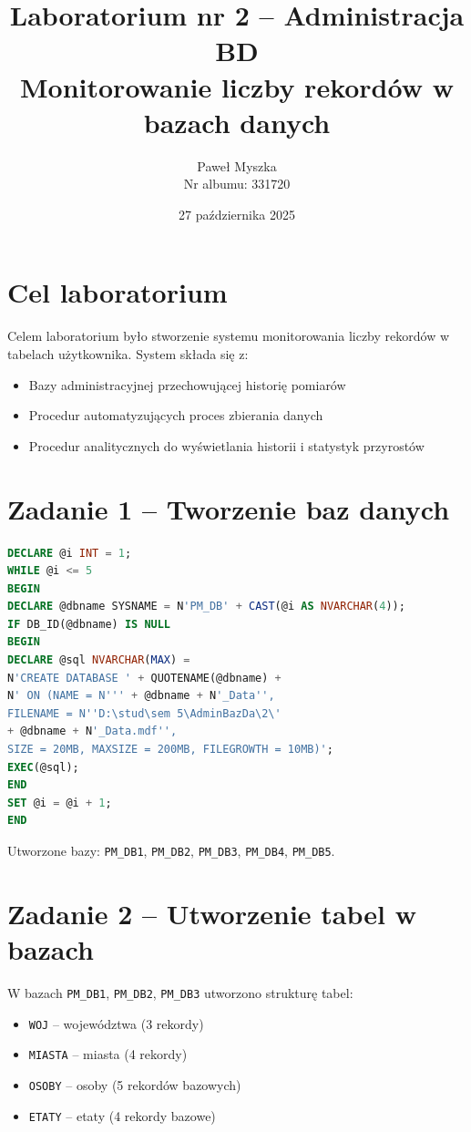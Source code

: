 \documentclass[a4paper,11pt]{article}
\title{Laboratorium nr 2 -- Administracja BD\\
	\large Monitorowanie liczby rekordów w bazach danych}
\author{Paweł Myszka\\
	Nr albumu: 331720}
\date{27 października 2025}
\begin{document}
	
	\maketitle
	\thispagestyle{fancy}
	
	\section{Cel laboratorium}
	
	Celem laboratorium było stworzenie systemu monitorowania liczby rekordów w tabelach użytkownika. System składa się z:
	\begin{itemize}
		\item Bazy administracyjnej przechowującej historię pomiarów
		\item Procedur automatyzujących proces zbierania danych
		\item Procedur analitycznych do wyświetlania historii i statystyk przyrostów
	\end{itemize}
	
	\section{Zadanie 1 -- Tworzenie baz danych}
	
	\begin{lstlisting}[language=SQL]
DECLARE @i INT = 1;
WHILE @i <= 5
BEGIN
DECLARE @dbname SYSNAME = N'PM_DB' + CAST(@i AS NVARCHAR(4));
IF DB_ID(@dbname) IS NULL
BEGIN
DECLARE @sql NVARCHAR(MAX) = 
N'CREATE DATABASE ' + QUOTENAME(@dbname) +
N' ON (NAME = N''' + @dbname + N'_Data'', 
FILENAME = N''D:\stud\sem 5\AdminBazDa\2\' 
+ @dbname + N'_Data.mdf'', 
SIZE = 20MB, MAXSIZE = 200MB, FILEGROWTH = 10MB)';
EXEC(@sql);
END
SET @i = @i + 1;
END
	\end{lstlisting}
	
	Utworzone bazy: \texttt{PM\_DB1}, \texttt{PM\_DB2}, \texttt{PM\_DB3}, \texttt{PM\_DB4}, \texttt{PM\_DB5}.
	
	\section{Zadanie 2 -- Utworzenie tabel w bazach}
	
	W bazach \texttt{PM\_DB1}, \texttt{PM\_DB2}, \texttt{PM\_DB3} utworzono strukturę tabel:
	
	\begin{itemize}
		\item \texttt{WOJ} -- województwa (3 rekordy)
		\item \texttt{MIASTA} -- miasta (4 rekordy)
		\item \texttt{OSOBY} -- osoby (5 rekordów bazowych)
		\item \texttt{ETATY} -- etaty (4 rekordy bazowe)
	\end{itemize}
	
\end{document}
